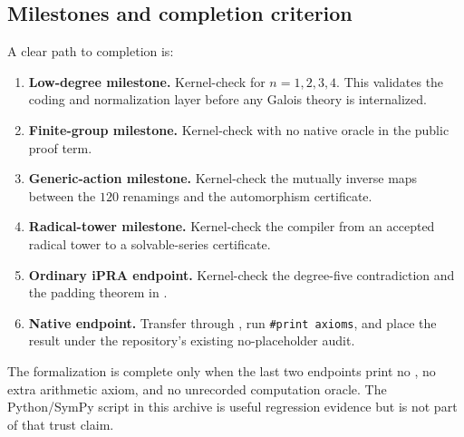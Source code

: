 \subsection{Milestones and completion criterion}

A clear path to completion is:

\begin{enumerate}
\item \textbf{Low-degree milestone.}  Kernel-check
   for $n=1,2,3,4$.  This validates the
  coding and normalization layer before any Galois theory is internalized.
\item \textbf{Finite-group milestone.}  Kernel-check
   with no native oracle in the public proof term.
\item \textbf{Generic-action milestone.}  Kernel-check the mutually inverse
  maps between the $120$ renamings and the automorphism certificate.
\item \textbf{Radical-tower milestone.}  Kernel-check the compiler from an
  accepted radical tower to a solvable-series certificate.
\item \textbf{Ordinary iPRA endpoint.}  Kernel-check the degree-five
  contradiction and the padding theorem in .
\item \textbf{Native endpoint.}  Transfer through
  , run \texttt{\#print axioms}, and place the result under
  the repository's existing no-placeholder audit.
\end{enumerate}

The formalization is complete only when the last two endpoints print no
, no extra arithmetic axiom, and no unrecorded computation
oracle.  The Python/SymPy script in this archive is useful regression evidence
but is not part of that trust claim.
